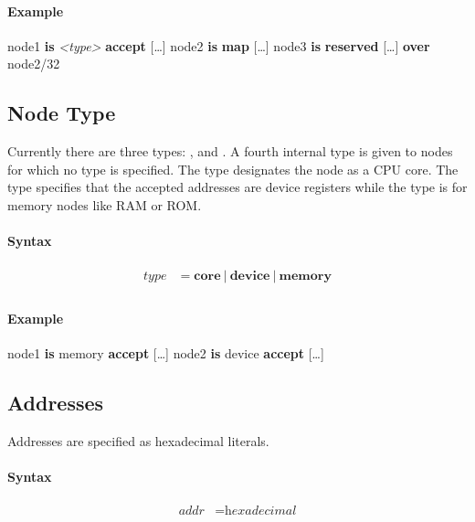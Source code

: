 \documentclass[a4paper,11pt,twoside]{report}
\begin{document}
{{{\paragraph{Example}
\begin{syntax}
    node1 \textbf{is} \textit{<type>} \textbf{accept} [\ldots]
    node2 \textbf{is} \textbf{map} [\ldots]
    node3 \textbf{is} \textbf{reserved} [\ldots] \textbf{over} node2/32
\end{syntax}

\subsection{Node Type}
Currently there are three types: ,  and . A fourth internal type  is given to nodes for which no type is specified.
The  type designates the node as a CPU core. The  type specifies that the accepted addresses are device registers while the  type is for memory nodes like RAM or ROM.

\paragraph{Syntax}
\begin{align*}
\textit{type} & \mathop{=}
    \textbf{core}\
    |\
    \textbf{device}\
    |\
    \textbf{memory} \\
\end{align*}

\paragraph{Example}
\begin{syntax}
    node1 \textbf{is} memory \textbf{accept} [\ldots]
    node2 \textbf{is} device \textbf{accept} [\ldots]
\end{syntax}

\subsection{Addresses}
Addresses are specified as hexadecimal literals.

\paragraph{Syntax}
\begin{align*}
\textit{addr} & \mathop{=} \textit{hexadecimal} \\
\end{align*}

}}}
\end{document}
